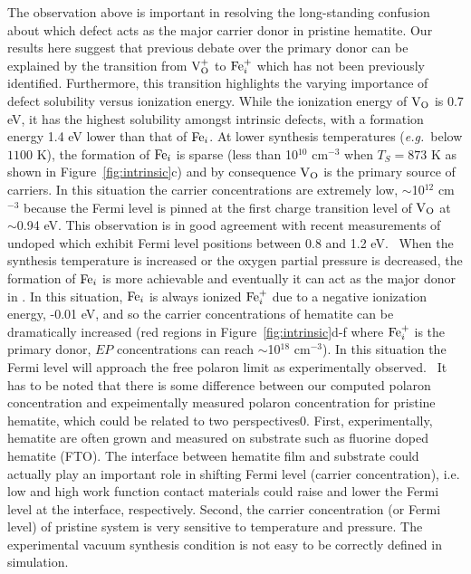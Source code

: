 The observation above is important in resolving the long-standing confusion about which defect acts as the major carrier donor in pristine hematite.
Our results here suggest that previous debate over the primary donor can be explained by the transition from $\text{V}_\text{O}^+$ to $\text{Fe}_i^+$ which has not been previously identified.
Furthermore, this transition highlights the varying importance of defect solubility versus ionization energy.
While the ionization energy of $\text{V}_\text{O}$ is 0.7 eV, it has the highest solubility amongst intrinsic defects, with a formation energy 1.4 eV lower than that of $\text{Fe}_i$.
At lower synthesis temperatures (\textit{e.g.}\ below $1100$ K), the formation of $\text{Fe}_i$ is sparse (less than 10$^{10}$ cm$^{-3}$ when $T_S=873$ K as shown in Figure~\ref{fig:intrinsic}c) and by consequence $\text{V}_\text{O}$ is the primary source of carriers.
In this situation the carrier concentrations are extremely low, $\sim$10$^{12}$ cm$^{-3}$ because the Fermi level is pinned at the first charge transition level of $\text{V}_\text{O}$ at $\sim$0.94 eV. This observation is in good agreement with recent measurements of undoped  which exhibit Fermi level positions between 0.8 and 1.2 eV.~\cite{lohaus2018limitation}
When the synthesis temperature is increased or the oxygen partial pressure is decreased, the formation of $\text{Fe}_i$ is more achievable and eventually it can act as the major donor in .
In this situation, $\text{Fe}_i$ is always ionized $\text{Fe}_i^+$ due to a negative ionization energy, -0.01 eV, and so the carrier concentrations of hematite can be dramatically increased (red regions in Figure~\ref{fig:intrinsic}d-f where $\text{Fe}_i^+$ is the primary donor, $EP$ concentrations can reach $\sim$10$^{18}$ cm$^{-3}$). In this situation the Fermi level will approach the free polaron limit as experimentally observed.~\cite{lohaus2018limitation}
It has to be noted that there is some difference between our computed polaron concentration and expeimentally measured polaron concentration for pristine hematite, which could be related to two perspectives0.\cite{wang2011facile, ling2012influence} First, experimentally, hematite are often grown and measured on substrate such as fluorine doped hematite (FTO). The interface between hematite film and substrate could actually play an important role in shifting Fermi level (carrier concentration), i.e. low and high work function contact materials could raise and lower the Fermi level at the interface, respectively.\cite{lohaus2018limitation}
 Second, the carrier concentration (or Fermi level) of pristine system is very sensitive to temperature and pressure. The experimental vacuum synthesis condition is not easy to be correctly defined in simulation.

